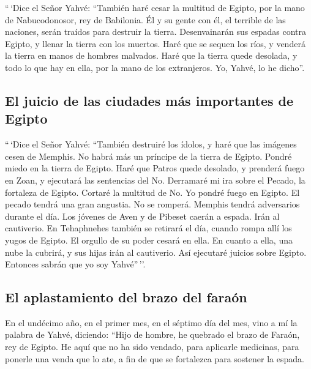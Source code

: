  ``\,`Dice el Señor Yahvé: ``También haré cesar la
multitud de Egipto, por la mano de Nabucodonosor, rey de Babilonia.
 Él y su gente con él, el terrible de las naciones, serán
traídos para destruir la tierra. Desenvainarán sus espadas contra
Egipto, y llenar la tierra con los muertos.  Haré que se
sequen los ríos, y venderá la tierra en manos de hombres malvados. Haré
que la tierra quede desolada, y todo lo que hay en ella, por la mano de
los extranjeros. Yo, Yahvé, lo he dicho''.

\hypertarget{el-juicio-de-las-ciudades-muxe1s-importantes-de-egipto}{%
\subsection{El juicio de las ciudades más importantes de
Egipto}\label{el-juicio-de-las-ciudades-muxe1s-importantes-de-egipto}}

 ``\,`Dice el Señor Yahvé: ``También destruiré los
ídolos, y haré que las imágenes cesen de Memphis. No habrá más un
príncipe de la tierra de Egipto. Pondré miedo en la tierra de Egipto.
 Haré que Patros quede desolado, y prenderá fuego en
Zoan, y ejecutará las sentencias del No.  Derramaré mi
ira sobre el Pecado, la fortaleza de Egipto. Cortaré la multitud de No.
 Yo pondré fuego en Egipto. El pecado tendrá una gran
angustia. No se romperá. Memphis tendrá adversarios durante el día.
 Los jóvenes de Aven y de Pibeset caerán a espada. Irán
al cautiverio.  En Tehaphnehes también se retirará el
día, cuando rompa allí los yugos de Egipto. El orgullo de su poder
cesará en ella. En cuanto a ella, una nube la cubrirá, y sus hijas irán
al cautiverio.  Así ejecutaré juicios sobre Egipto.
Entonces sabrán que yo soy Yahvé''\,''.

\hypertarget{el-aplastamiento-del-brazo-del-farauxf3n}{%
\subsection{El aplastamiento del brazo del
faraón}\label{el-aplastamiento-del-brazo-del-farauxf3n}}

 En el undécimo año, en el primer mes, en el séptimo día
del mes, vino a mí la palabra de Yahvé, diciendo:  ``Hijo
de hombre, he quebrado el brazo de Faraón, rey de Egipto. He aquí que no
ha sido vendado, para aplicarle medicinas, para ponerle una venda que lo
ate, a fin de que se fortalezca para sostener la espada.

